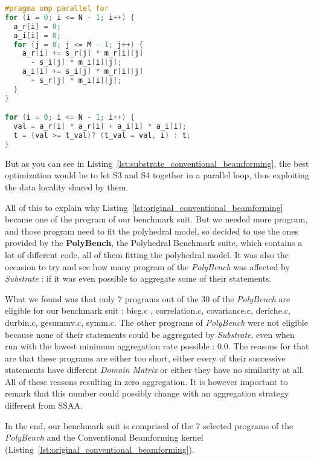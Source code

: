 \documentclass[paper=a4, fontsize=11.5pt]{scrartcl}
\numberwithin{equation}{section}        %
\numberwithin{figure}{section}          %
\numberwithin{table}{section}               %
\begin{document}
\hfill
\begin{minipage}[t]{0.45\textwidth}
\begin{lstlisting}[frame=single, language=C, basicstyle=\scriptsize, caption={Goal version of Conventional Beamforming kernel}, label={lst:substrate_conventional_beamforming}]
#pragma omp parallel for
for (i = 0; i <= N - 1; i++) {
  a_r[i] = 0;
  a_i[i] = 0;
  for (j = 0; j <= M - 1; j++) {
    a_r[i] += s_r[j] * m_r[i][j]
      - s_i[j] * m_i[i][j];
    a_i[i] += s_i[j] * m_r[i][j]
      + s_r[j] * m_i[i][j];
  }
}

for (i = 0; i <= N - 1; i++) {
  val = a_r[i] * a_r[i] + a_i[i] * a_i[i];
  t = (val >= t_val)? (t_val = val, i) : t;
}
\end{lstlisting}
\end{minipage}
But as you can see in Listing~\ref{lst:substrate_conventional_beamforming}, the best optimization
would be to let S3 and S4 together in a parallel loop, thus exploiting the data locality
shared by them.

\bigskip

All of this to explain why Listing~\ref{lst:original_conventional_beamforming} became one
of the program of our benchmark suit. But we needed more program, and those program need to
fit the polyhedral model, so decided to use the ones provided by the \textbf{PolyBench},
the Polyhedral Benchmark suite, which contains a lot of different code, all of them fitting
the polyhedral model. It was also the occasion to try and see how many program of the \textit{PolyBench}
was affected by \textit{Substrate} : if it was even possible to aggregate some of their statements.

What we found was that only 7 programs out of the 30 of the \textit{PolyBench} are eligible
 for our benchmark suit : bicg.c , correlation.c, covariance.c, deriche.c, durbin.c, gesummv.c, symm.c.
The other programs of \textit{PolyBench} were not eligible because none of their statements could be
aggregated by \textit{Substrate}, even when run with the lowest minimum aggregation rate possible : 0.0.
The reasons for that are that these programs are either too short, either every of their
successive statements have different \textit{Domain Matrix} or either they have no similarity at all.
All of these reasons resulting in zero aggregation. It is however important to remark that
this number could possibly change with an aggregation strategy different from SSAA.

\bigskip

In the end, our benchmark suit is comprised of the 7 selected programs of the \textit{PolyBench}
and the Conventional Beamforming kernel (Listing~\ref{lst:original_conventional_beamforming}).
\end{document}
